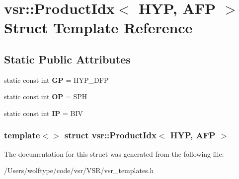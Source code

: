 \hypertarget{structvsr_1_1_product_idx_3_01_h_y_p_00_01_a_f_p_01_4}{\section{vsr\-:\-:Product\-Idx$<$ H\-Y\-P, A\-F\-P $>$ Struct Template Reference}
\label{structvsr_1_1_product_idx_3_01_h_y_p_00_01_a_f_p_01_4}
}
\subsection*{Static Public Attributes}
\begin{DoxyCompactItemize}
\item 
\hypertarget{structvsr_1_1_product_idx_3_01_h_y_p_00_01_a_f_p_01_4_ac32638a21d336604cf2c9af5ab410f6e}{static const int {\bfseries G\-P} = H\-Y\-P\-\_\-\-D\-F\-P}\label{structvsr_1_1_product_idx_3_01_h_y_p_00_01_a_f_p_01_4_ac32638a21d336604cf2c9af5ab410f6e}

\item 
\hypertarget{structvsr_1_1_product_idx_3_01_h_y_p_00_01_a_f_p_01_4_ab68e8db99346cd07b55bdfe313bf3c4d}{static const int {\bfseries O\-P} = S\-P\-H}\label{structvsr_1_1_product_idx_3_01_h_y_p_00_01_a_f_p_01_4_ab68e8db99346cd07b55bdfe313bf3c4d}

\item 
\hypertarget{structvsr_1_1_product_idx_3_01_h_y_p_00_01_a_f_p_01_4_af79b53f37846472eb9ad571435390252}{static const int {\bfseries I\-P} = B\-I\-V}\label{structvsr_1_1_product_idx_3_01_h_y_p_00_01_a_f_p_01_4_af79b53f37846472eb9ad571435390252}

\end{DoxyCompactItemize}
\subsubsection*{template$<$$>$ struct vsr\-::\-Product\-Idx$<$ H\-Y\-P, A\-F\-P $>$}



The documentation for this struct was generated from the following file\-:\begin{DoxyCompactItemize}
\item 
/\-Users/wolftype/code/vsr/\-V\-S\-R/vsr\-\_\-templates.\-h\end{DoxyCompactItemize}
